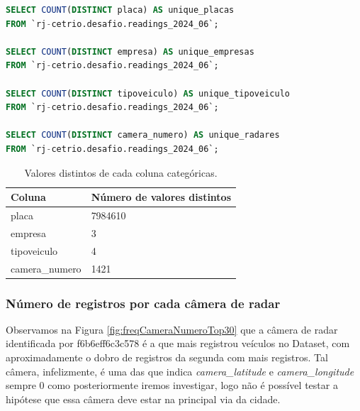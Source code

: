 \documentclass{article}
\begin{document}
\begin{lstlisting}[language=SQL,caption={Query SQL para contar quantidade de valores distintos para as colunas categóricas do dataset},label={lst:sqlquery}]
SELECT COUNT(DISTINCT placa) AS unique_placas
FROM `rj-cetrio.desafio.readings_2024_06`;

SELECT COUNT(DISTINCT empresa) AS unique_empresas
FROM `rj-cetrio.desafio.readings_2024_06`;

SELECT COUNT(DISTINCT tipoveiculo) AS unique_tipoveiculo
FROM `rj-cetrio.desafio.readings_2024_06`;

SELECT COUNT(DISTINCT camera_numero) AS unique_radares
FROM `rj-cetrio.desafio.readings_2024_06`;
\end{lstlisting}

\begin{table}
\centering
\begin{tabular}{|l|l|}
\hline
Coluna         & Número de valores distintos \\\hline
placa          & 7984610 \\\hline
empresa        & 3       \\\hline
tipoveiculo  & 4       \\\hline
camera\_numero & 1421    \\\hline
\end{tabular}
\caption{\label{tab:categorics}Valores distintos de cada coluna categóricas.}
\end{table}

\subsubsection{Número de registros por cada câmera de radar}

Observamos na Figura \ref{fig:freqCameraNumeroTop30} que a câmera de radar identificada por f6b6eff6c3c578 é a que mais registrou veículos no Dataset, com aproximadamente o dobro de registros da segunda com mais registros. Tal câmera, infelizmente, é uma das que indica \textit{camera\_latitude} e \textit{camera\_longitude} sempre 0 como posteriormente iremos investigar, logo não é possível testar a hipótese que essa câmera deve estar na principal via da cidade.
\end{document}
